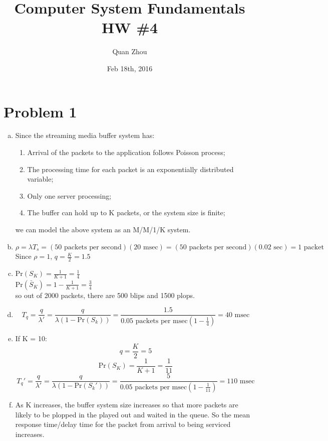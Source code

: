 \documentclass{article}   	                         %
\title{Computer System Fundamentals HW \#4}
\author{Quan Zhou}
\date{Feb 18th, 2016}
\begin{document}
\maketitle
\section*{Problem 1}
\begin{enumerate}[(a)]
\item
Since the streaming media buffer system has:
\begin{enumerate}[.]
\item Arrival of the packets to the application follows Poisson process;
\item The processing time for each packet is an exponentially distributed variable;
\item Only one server processing;
\item The buffer can hold up to K packets, or the system size is finite;
\end{enumerate}
we can model the above system as an M/M/1/K system.\\
\item
$\rho = \lambda T_s = (50 \text{  packets per second})(20 \text {  msec}) = (50 \text{  packets per second})(0.02 \text {  sec}) = 1 \text {  packet}$\\
Since $\rho = 1$, $q = \frac{K}{2}  = 1.5$\\
\item
$\text {Pr}(S_K) = \frac{1}{K+1} = \frac{1}{4}$\\
$\text {Pr}(\bar S_K) = 1 - \frac{1}{K+1} = \frac{3}{4}$\\
so out of 2000 packets, there are 500 blips and 1500 plops.\\
\item
$$T_q = \frac{q}{\lambda \prime} = \frac{q}{\lambda (1-\text{Pr}(S_k))} = \frac{1.5}{0.05 \text{  packets per msec} (1 - \frac{1}{4})} = 40 \text{  msec}$$
\item
If K = 10:\\
$$q = \frac{K}{2} = 5$$
$$\text {Pr}(S_K) = \frac{1}{K+1} = \frac{1}{11}$$
$$T_q \prime = \frac{q}{\lambda \prime} = \frac{q}{\lambda (1-\text{Pr}(S_k \prime))} = \frac{5}{0.05 \text{  packets per msec} (1 - \frac{1}{11})} = 110 \text{  msec}$$
\item
As K increases, the buffer system size increases so that more packets are likely to be plopped in the played out and waited in the queue. So the mean response time/delay time for the packet from arrival to being serviced increases.\\

\end{enumerate}
\end{document}
